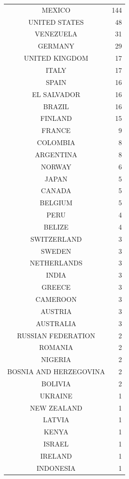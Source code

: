 \documentclass[mingoth,a4paper]{jsarticle}
\begin{document}
{{{{{{{{{{{\begin{minipage}[t]{0.5\hsize}
\end{minipage}
\begin{minipage}[t]{0.5\hsize}

 {\footnotesize
\begin{center}
 
 \begin{tabular}[t]{@{\vrule width 1pt}c|r@{\ \vrule width 1pt}}
 MEXICO & 144 \\
 UNITED STATES & 48 \\
 VENEZUELA & 31 \\
 GERMANY & 29 \\
 UNITED KINGDOM & 17 \\
 ITALY & 17 \\
 SPAIN & 16 \\
 EL SALVADOR & 16 \\
 BRAZIL & 16 \\
 FINLAND & 15 \\
 FRANCE & 9 \\
 COLOMBIA & 8 \\
 ARGENTINA & 8 \\
 NORWAY & 6 \\
 JAPAN & 5 \\
 CANADA & 5 \\
 BELGIUM & 5 \\
 PERU & 4 \\
 BELIZE & 4 \\
 SWITZERLAND & 3 \\
 SWEDEN & 3 \\
 NETHERLANDS & 3 \\
 INDIA & 3 \\
 GREECE & 3 \\
 CAMEROON & 3 \\
 AUSTRIA & 3 \\
 AUSTRALIA & 3 \\
 RUSSIAN FEDERATION & 2 \\
 ROMANIA & 2 \\
 NIGERIA & 2 \\
 BOSNIA AND HERZEGOVINA & 2 \\
 BOLIVIA & 2 \\
 UKRAINE & 1 \\
 NEW ZEALAND & 1 \\
 LATVIA & 1 \\
 KENYA & 1 \\
 ISRAEL & 1 \\
 IRELAND & 1 \\
 INDONESIA & 1 \\

\end{tabular}
\end{center}}
\end{minipage}}}}}}}}}}}}
\end{document}
